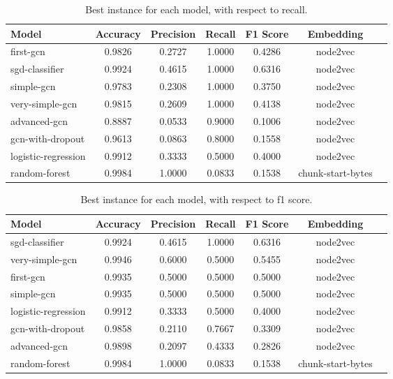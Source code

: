 \begin{table}[H]
    \centering
    \caption{Best instance for each model, with respect to recall.}
    \begin{tabular}{|l|c|c|c|c|c|c|} \hline 
      \textbf{Model}  & \textbf{Accuracy} & \textbf{Precision} & \textbf{Recall} & \textbf{F1 Score} & \textbf{Embedding}  \\ \hline 
        first-gcn & 0.9826 & 0.2727 & 1.0000 & 0.4286 & node2vec \\ \hline 
        sgd-classifier & 0.9924 & 0.4615 & 1.0000 & 0.6316 & node2vec \\ \hline 
        simple-gcn & 0.9783 & 0.2308 & 1.0000 & 0.3750 & node2vec \\ \hline 
        very-simple-gcn & 0.9815 & 0.2609 & 1.0000 & 0.4138 & node2vec \\ \hline 
        advanced-gcn & 0.8887 & 0.0533 & 0.9000 & 0.1006 & node2vec \\ \hline 
        gcn-with-dropout & 0.9613 & 0.0863 & 0.8000 & 0.1558 & node2vec \\ \hline 
        logistic-regression & 0.9912 & 0.3333 & 0.5000 & 0.4000 & node2vec \\ \hline 
        random-forest & 0.9984 & 1.0000 & 0.0833 & 0.1538 & chunk-start-bytes \\ \hline 
    \end{tabular}
\end{table}


\begin{table}[H]
    \centering
    \caption{Best instance for each model, with respect to f1 score.}
    \begin{tabular}{|l|c|c|c|c|c|c|} \hline 
      \textbf{Model}  & \textbf{Accuracy} & \textbf{Precision} & \textbf{Recall} & \textbf{F1 Score} & \textbf{Embedding}  \\ \hline 
        sgd-classifier & 0.9924 & 0.4615 & 1.0000 & 0.6316 & node2vec \\ \hline 
        very-simple-gcn & 0.9946 & 0.6000 & 0.5000 & 0.5455 & node2vec \\ \hline 
        first-gcn & 0.9935 & 0.5000 & 0.5000 & 0.5000 & node2vec \\ \hline 
        simple-gcn & 0.9935 & 0.5000 & 0.5000 & 0.5000 & node2vec \\ \hline 
        logistic-regression & 0.9912 & 0.3333 & 0.5000 & 0.4000 & node2vec \\ \hline 
        gcn-with-dropout & 0.9858 & 0.2110 & 0.7667 & 0.3309 & node2vec \\ \hline 
        advanced-gcn & 0.9898 & 0.2097 & 0.4333 & 0.2826 & node2vec \\ \hline 
        random-forest & 0.9984 & 1.0000 & 0.0833 & 0.1538 & chunk-start-bytes \\ \hline 
    \end{tabular}
\end{table}


